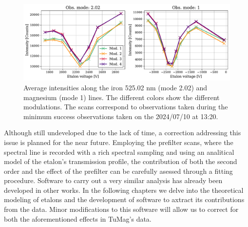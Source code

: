 \begin{figure}[t]
  \includegraphics[width=\textwidth]{figures/Pipeline/Spectral_scans_ecample.pdf}
  \caption{
    Average intensities along the iron 525.02 nm (mode 2.02) and magnesium (mode 1) lines. The different colors show the different modulations. The scans correspond to observations taken during the minimum success observations taken on the 2024/07/10 at 13:20.}
    \label{fig_pipeline: spectral_scans}
\end{figure}

Although still undeveloped due to the lack of time, a correction addressing this issue is planned for the near future. Employing the prefilter scans, where the spectral line is recorded with a rich spectral sampling and using an analitical model of the etalon's transmission profile, the contribution of both the second order and the effect of the prefilter can be carefully asessed through a fitting procedure. Software to carry out a very similar analysis has already been developed in other works. In the following chapters we delve into the theoretical modeling of etalons and the development of software to axtract its contributions from the data. Minor modifications to this software will allow us to correct for both the aforementioned effects in TuMag's data. 

